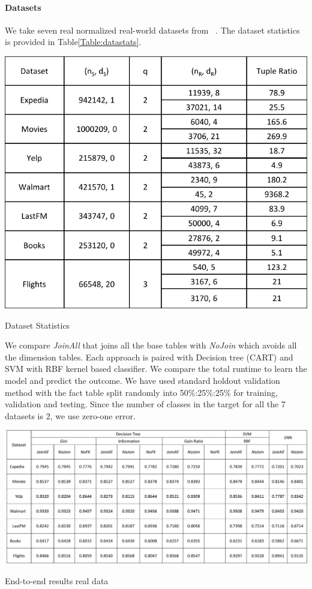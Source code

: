 \documentclass[sigconf]{acmart}
\begin{document}
\paragraph*{Datasets}
We take seven real normalized real-world datasets from ~\cite{arun}. The dataset statistics is provided in Table\ref{Table:datastats}.
\begin{table}
\centering
\includegraphics[width=\columnwidth,height=\textheight,keepaspectratio]{table1.pdf}
\caption{Dataset Statistics}
\label{Table:datastats}
\end{table}
We compare \textit{JoinAll} that joins all the base tables with \textit{NoJoin} which avoids all the dimension tables. Each approach is paired with Decision tree (CART) and SVM with RBF kernel based classifier. We compare the total runtime to learn the model and predict the outcome. We have used standard holdout validation method with the fact table split randomly into 50\%:25\%:25\% for training, validation and testing. Since the number of classes in the target for all the 7 datasets is 2, we use zero-one error. 
\begin{table}
\centering
\includegraphics[width=2\columnwidth,height=\textheight,keepaspectratio]{table2.pdf}
\caption{End-to-end results real data}
\label{Table:svm_tree}
\end{table}
\end{document}

